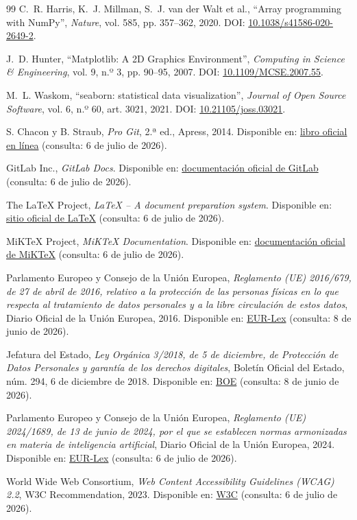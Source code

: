 \begin{sloppypar}
\begin{thebibliography}{99}
C.~R. Harris, K.~J. Millman, S.~J. van der Walt et al., ``Array programming with NumPy'', \textit{Nature}, vol. 585, pp. 357--362, 2020. DOI\@: \href{https://doi.org/10.1038/s41586-020-2649-2}{10.1038/s41586-020-2649-2}.

J.~D. Hunter, ``Matplotlib: A 2D Graphics Environment'', \textit{Computing in Science \& Engineering}, vol. 9, n.º 3, pp. 90--95, 2007. DOI\@: \href{https://doi.org/10.1109/MCSE.2007.55}{10.1109/MCSE.2007.55}.

M.~L. Waskom, ``seaborn: statistical data visualization'', \textit{Journal of Open Source Software}, vol. 6, n.º 60, art. 3021, 2021. DOI\@: \href{https://doi.org/10.21105/joss.03021}{10.21105/joss.03021}.

S. Chacon y B. Straub, \textit{Pro Git}, 2.ª ed., Apress, 2014. Disponible en: \href{https://git-scm.com/book/en/v2}{libro oficial en línea} (consulta: 6 de julio de 2026).

GitLab Inc., \textit{GitLab Docs}. Disponible en: \href{https://docs.gitlab.com/}{documentación oficial de GitLab} (consulta: 6 de julio de 2026).

The LaTeX Project, \textit{LaTeX -- A document preparation system}. Disponible en: \href{https://www.latex-project.org/}{sitio oficial de LaTeX} (consulta: 6 de julio de 2026).

MiKTeX Project, \textit{MiKTeX Documentation}. Disponible en: \href{https://miktex.org/docs}{documentación oficial de MiKTeX} (consulta: 6 de julio de 2026).

Parlamento Europeo y Consejo de la Unión Europea, \textit{Reglamento (UE) 2016/679, de 27 de abril de 2016, relativo a la protección de las personas físicas en lo que respecta al tratamiento de datos personales y a la libre circulación de estos datos}, Diario Oficial de la Unión Europea, 2016. Disponible en: \href{https://eur-lex.europa.eu/eli/reg/2016/679/oj?locale=es}{EUR-Lex} (consulta: 8 de junio de 2026).

Jefatura del Estado, \textit{Ley Orgánica 3/2018, de 5 de diciembre, de Protección de Datos Personales y garantía de los derechos digitales}, Boletín Oficial del Estado, núm. 294, 6 de diciembre de 2018. Disponible en: \href{https://www.boe.es/buscar/act.php?id=BOE-A-2018-16673}{BOE} (consulta: 8 de junio de 2026).

Parlamento Europeo y Consejo de la Unión Europea, \textit{Reglamento (UE) 2024/1689, de 13 de junio de 2024, por el que se establecen normas armonizadas en materia de inteligencia artificial}, Diario Oficial de la Unión Europea, 2024. Disponible en: \href{https://eur-lex.europa.eu/eli/reg/2024/1689/oj}{EUR-Lex} (consulta: 6 de julio de 2026).

World Wide Web Consortium, \textit{Web Content Accessibility Guidelines (WCAG) 2.2}, W3C Recommendation, 2023. Disponible en: \href{https://www.w3.org/TR/WCAG22/}{W3C} (consulta: 6 de julio de 2026).

\end{thebibliography}
\end{sloppypar}

